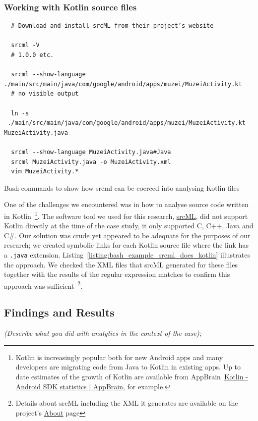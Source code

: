 \subsubsection{Working with Kotlin source files}
\label{subsection_srcml_working_with_kotlin_files}

\begin{listing}
\begin{verbatim}
  # Download and install srcML from their project’s website

  srcml -V
  # 1.0.0 etc.

  srcml --show-language ./main/src/main/java/com/google/android/apps/muzei/MuzeiActivity.kt
  # no visible output

  ln -s  ./main/src/main/java/com/google/android/apps/muzei/MuzeiActivity.kt MuzeiActivity.java

  srcml --show-language MuzeiActivity.java#Java
  srcml MuzeiActivity.java -o MuzeiActivity.xml
  vim MuzeiActivity.*
\end{verbatim}
\caption{Bash commands to show how srcml can be coerced into analysing Kotlin files}
\label{listing:bash_example_srcml_does_kotlin}
\end{listing}

One of the challenges we encountered was in how to analyse source code written in Kotlin~\footnote{Kotlin is increasingly popular both for new Android apps and many developers are migrating code from Java to Kotlin in existing apps. Up to date estimates of the growth of Kotlin are available from AppBrain~\href{https://www.appbrain.com/stats/libraries/details/kotlin/kotlin}{Kotlin - Android SDK statistics | AppBrain}, for example.}. 
The software tool we used for this research, \href{https://www.srcml.org/}{srcML}, did not support Kotlin directly at the time of the case study, it only supported C, C++, Java and C\#. Our solution was crude yet appeared to be adequate for the purposes of our research; we created symbolic links for each Kotlin source file where the link has a \texttt{.java} extension. Listing~\ref{listing:bash_example_srcml_does_kotlin} illustrates the approach. We checked the XML files that srcML generated for these files together with the results of the regular expression matches to confirm this approach was sufficient~\footnote{Details about srcML including the XML it generates are available on the project's \href{https://www.srcml.org/about.html}{About} page}. 

\subsection{Findings and Results}
\textit{(Describe what you did with analytics in the context of the case);} 




